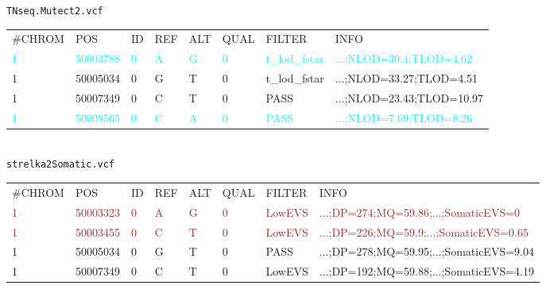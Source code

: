\normalsize
\texttt{TNseq.Mutect2.vcf}
\tiny
\begin{tabular}{llllllll}
\#CHROM & POS & ID & REF & ALT & QUAL & FILTER & INFO \\
\textcolor{cyan}{1} &
\textcolor{cyan}{50003788} &
\textcolor{cyan}{0} &
\textcolor{cyan}{A} &
\textcolor{cyan}{G} &
\textcolor{cyan}{0} &
\textcolor{cyan}{t\_lod\_fstar} &
\textcolor{cyan}{...;NLOD=30.4;TLOD=4.62} \\
\textcolor{cyan!50!brown}{1} &
\textcolor{cyan!50!brown}{50005034} &
\textcolor{cyan!50!brown}{0} &
\textcolor{cyan!50!brown}{G} &
\textcolor{cyan!50!brown}{T} &
\textcolor{cyan!50!brown}{0} &
\textcolor{cyan!50!brown}{t\_lod\_fstar} &
\textcolor{cyan!50!brown}{...;NLOD=33.27;TLOD=4.51} \\
\textcolor{cyan!50!brown}{1} &
\textcolor{cyan!50!brown}{50007349} &
\textcolor{cyan!50!brown}{0} &
\textcolor{cyan!50!brown}{C} &
\textcolor{cyan!50!brown}{T} &
\textcolor{cyan!50!brown}{0} &
\textcolor{cyan!50!brown}{PASS} &
\textcolor{cyan!50!brown}{...;NLOD=23.43;TLOD=10.97} \\
\textcolor{cyan}{1} &
\textcolor{cyan}{50008565} &
\textcolor{cyan}{0} &
\textcolor{cyan}{C} &
\textcolor{cyan}{A} &
\textcolor{cyan}{0} &
\textcolor{cyan}{PASS} &
\textcolor{cyan}{...;NLOD=7.69;TLOD=8.26} \\
\end{tabular}
\\[1em]
\normalsize
\texttt{strelka2Somatic.vcf}
\tiny
\begin{tabular}{llllllll}
\#CHROM & POS & ID & REF & ALT & QUAL & FILTER & INFO \\
\textcolor{brown}{1} &
\textcolor{brown}{50003323} &
\textcolor{brown}{0} &
\textcolor{brown}{A} &
\textcolor{brown}{G} &
\textcolor{brown}{0} &
\textcolor{brown}{LowEVS} &
\textcolor{brown}{...;DP=274;MQ=59.86;...;SomaticEVS=0} \\
\textcolor{brown}{1} &
\textcolor{brown}{50003455} &
\textcolor{brown}{0} &
\textcolor{brown}{C} &
\textcolor{brown}{T} &
\textcolor{brown}{0} &
\textcolor{brown}{LowEVS} &
\textcolor{brown}{...;DP=226;MQ=59.9;...;SomaticEVS=0.65} \\
\textcolor{cyan!50!brown}{1} &
\textcolor{cyan!50!brown}{50005034} &
\textcolor{cyan!50!brown}{0} &
\textcolor{cyan!50!brown}{G} &
\textcolor{cyan!50!brown}{T} &
\textcolor{cyan!50!brown}{0} &
\textcolor{cyan!50!brown}{PASS} &
\textcolor{cyan!50!brown}{...;DP=278;MQ=59.95;...;SomaticEVS=9.04} \\
\textcolor{cyan!50!brown}{1} &
\textcolor{cyan!50!brown}{50007349} &
\textcolor{cyan!50!brown}{0} &
\textcolor{cyan!50!brown}{C} &
\textcolor{cyan!50!brown}{T} &
\textcolor{cyan!50!brown}{0} &
\textcolor{cyan!50!brown}{LowEVS} &
\textcolor{cyan!50!brown}{...;DP=192;MQ=59.88;...;SomaticEVS=4.19} \\
\end{tabular}
\normalsize
